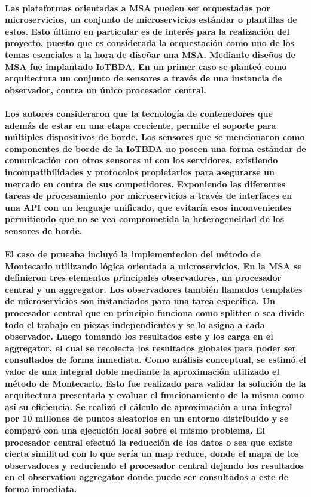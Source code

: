 \paragraph{
    Las plataformas orientadas a MSA pueden ser orquestadas por microservicios, un conjunto de microservicios estándar o plantillas de estos. Esto último en particular es de interés para la realización del proyecto, puesto que es considerada la orquestación como uno de los temas esenciales a la hora de diseñar una MSA. Mediante diseños de MSA fue implantado IoTBDA. En un primer caso se planteó como arquitectura un conjunto de sensores a través de una instancia de observador, contra un único procesador central.
}

\paragraph{
    Los autores consideraron que la tecnología de contenedores que además de estar en una etapa creciente, permite el soporte para múltiples dispositivos de borde.
    Los sensores que se mencionaron como componentes de borde de la IoTBDA no poseen una forma estándar de comunicación con otros sensores ni con los servidores, existiendo incompatibilidades y protocolos propietarios para asegurarse un mercado en contra de sus competidores. Exponiendo las diferentes tareas de procesamiento por microservicios a través de  interfaces en una API con un lenguaje unificado, que evitaría esos inconvenientes permitiendo que no se vea comprometida la heterogeneidad de los sensores de borde.
}

\paragraph{
    El caso de prueaba incluyó la implementecion del método de Montecarlo utilizando lógica orientada a microservicios.
    En la  MSA se definieron tres elementos principales observadores, un procesador central y un aggregator.
    Los observadores también llamados templates de microservicios son instanciados para una tarea específica.
    Un procesador central que en principio funciona como splitter o sea divide todo el trabajo en piezas independientes y se lo asigna a cada observador.
    Luego tomando los resultados este y los carga en el aggregator, el cual se recolecta los resultados globales para poder ser consultados de forma inmediata.
    Como análisis conceptual, se estimó el valor de una integral doble mediante la aproximación utilizado el método de Montecarlo. Esto fue realizado para validar la solución de la arquitectura presentada y evaluar el funcionamiento de la misma como así su eficiencia. Se realizó el cálculo de aproximación a una integral por 10 millones de puntos aleatorios en un entorno distribuido y se comparó con una ejecución local sobre el mismo problema.
    El procesador central efectuó la reducción de los datos o sea que existe cierta similitud con lo que sería un map reduce, donde el mapa de los observadores y reduciendo el procesador central dejando los resultados en el observation aggregator donde puede ser consultados a este de forma inmediata.
}

